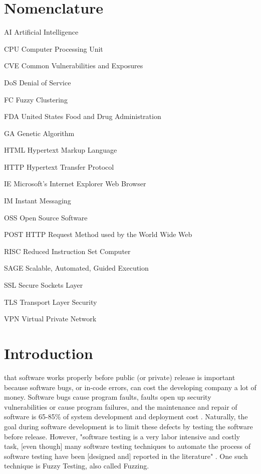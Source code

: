 \documentclass[10pt, final, journal, letterpaper, twoside, twocolumn]{IEEEtran}
\begin{document}
\section*{Nomenclature}
\begin{IEEEdescription}
\item[AI] Artificial Intelligence
\item[CPU] Computer Processing Unit
\item[CVE] Common Vulnerabilities and Exposures
\item[DoS] Denial of Service
\item[FC] Fuzzy Clustering
\item[FDA] United States Food and Drug Administration
\item[GA] Genetic Algorithm
\item[HTML] Hypertext Markup Language
\item[HTTP] Hypertext Transfer Protocol
\item[IE] Microsoft's Internet Explorer Web Browser
\item[IM] Instant Messaging
\item[OSS] Open Source Software
\item[POST] HTTP Request Method used by the World Wide Web
\item[RISC] Reduced Instruction Set Computer
\item[SAGE] Scalable, Automated, Guided Execution
\item[SSL] Secure Sockets Layer
\item[TLS] Transport Layer Security
\item[VPN] Virtual Private Network\\
\end{IEEEdescription}

\section{\label{sec:introduction}Introduction}
	 that software works properly before public (or private) release is important because software bugs, or in-code errors, can cost the developing company a lot of money. Software bugs cause program faults, faults open up security vulnerabilities or cause program failures, and the maintenance and repair of software is 65-85\% of system development and deployment cost \cite{slide-defect}. Naturally, the goal during software development is to limit these defects by testing the software before release. However, "software testing is a very labor intensive and costly task, [even though] many software testing techniques to automate the process of software testing have been [designed and] reported in the literature" \cite{fuzzy-logic}. One such technique is Fuzzy Testing, also called Fuzzing.
	
\end{document}
